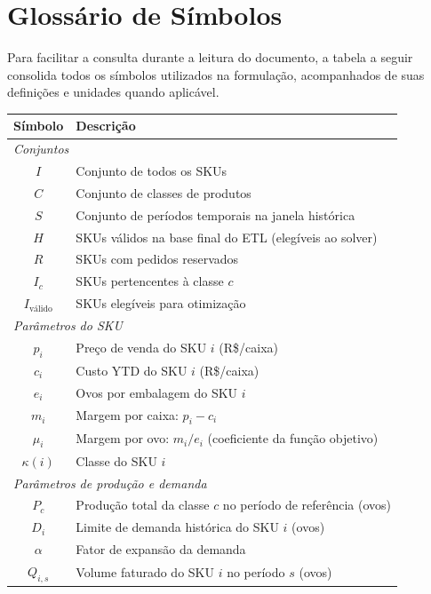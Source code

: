 \documentclass[11pt,a4paper]{article}
\begin{document}
\section{Glossário de Símbolos}

Para facilitar a consulta durante a leitura do documento, a tabela a seguir
consolida todos os símbolos utilizados na formulação, acompanhados de suas
definições e unidades quando aplicável.

\begin{longtable}{cl}
\toprule
\textbf{Símbolo} & \textbf{Descrição} \\
\midrule
\endhead
\multicolumn{2}{l}{\textit{Conjuntos}} \\[4pt]
$I$ & Conjunto de todos os SKUs \\
$C$ & Conjunto de classes de produtos \\
$S$ & Conjunto de períodos temporais na janela histórica \\
$H$ & SKUs válidos na base final do ETL (elegíveis ao solver) \\
$R$ & SKUs com pedidos reservados \\
$I_c$ & SKUs pertencentes à classe $c$ \\
$I_{\text{válido}}$ & SKUs elegíveis para otimização \\
\midrule
\multicolumn{2}{l}{\textit{Parâmetros do SKU}} \\[4pt]
$p_i$ & Preço de venda do SKU $i$ (R\$/caixa) \\
$c_i$ & Custo YTD do SKU $i$ (R\$/caixa) \\
$e_i$ & Ovos por embalagem do SKU $i$ \\
$m_i$ & Margem por caixa: $p_i - c_i$ \\
$\mu_i$ & Margem por ovo: $m_i / e_i$ (coeficiente da função objetivo) \\
$\kappa(i)$ & Classe do SKU $i$ \\
\midrule
\multicolumn{2}{l}{\textit{Parâmetros de produção e demanda}} \\[4pt]
$P_c$ & Produção total da classe $c$ no período de referência (ovos) \\
$D_i$ & Limite de demanda histórica do SKU $i$ (ovos) \\
$\alpha$ & Fator de expansão da demanda \\
$Q_{i,s}$ & Volume faturado do SKU $i$ no período $s$ (ovos) \\

\end{longtable}
\end{document}
